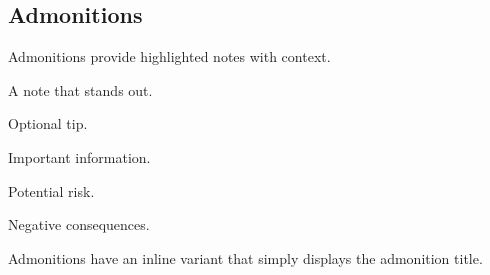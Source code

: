 \documentclass[10pt,titlepage]{article}
\begin{document}

\subsection{Admonitions}

Admonitions provide highlighted notes with context.

\begin{example}
\begin{note}
  A note that stands out.
\end{note}
\end{example}

\begin{example}
\begin{tip}
  Optional tip.
\end{tip}
\end{example}

\begin{example}
\begin{important}
  Important information.
\end{important}
\end{example}

\begin{example}
\begin{caution}
  Potential risk.
\end{caution}
\end{example}

\begin{example}
\begin{danger}
  Negative consequences.
\end{danger}
\end{example}

Admonitions have an inline variant that simply displays the admonition title.

\begin{example}
\tipinline{} \\
\noteinline{} \\
\importantinline{} \\
\cautioninline{} \\
\dangerinline{}
\end{example}

\end{document}
